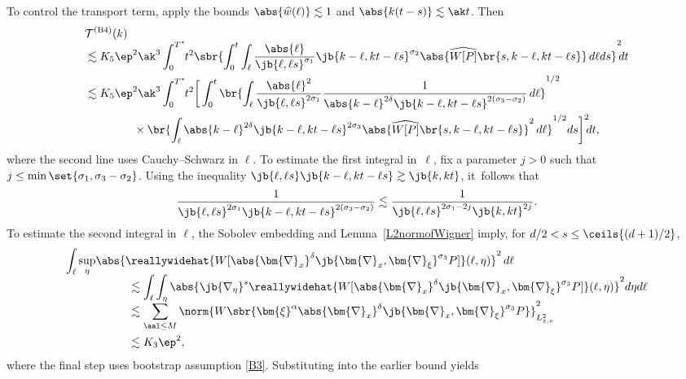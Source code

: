 To control the transport term, apply the bounds $\abs{\widehat w(\ell)}\lesssim1$ and $\abs{k(t-s)}\lesssim\ak t$. Then
\begin{align*}
&\mathcal{T}^{\mathrm{(B4)}}(k)\\[-5pt]
&\lesssim K_5\ep^2\ak^3\int_{0}^{T^*}\hspace{-0.1cm}t^2\sbr{\int_{0}^t\int_\ell\frac{\abs{\ell}}{\jb{\ell,\ell s}^{\sigma_1}} \jb{k-\ell,kt-\ell s}^{\sigma_2}\abs{\widehat {W[P]}\br{s,k-\ell,kt-\ell s}}\,d\ell ds}^2\hspace{-0.1cm}dt\\
&\lesssim K_5\ep^2\ak^3\int_{0}^{T^*}\hspace{-0.1cm}t^2\bigg[\int_{0}^t\br{\int_\ell\frac{\abs{\ell}^2}{\jb{\ell,\ell s}^{2\sigma_1}}\frac{1}{\abs{k-\ell}^{2\delta}\jb{k-\ell,kt-\ell s}^{2(\sigma_3-\sigma_2)}}\,d\ell}^{1/2} \\
&\hspace{1.5cm}\times\br{\int_\ell\abs{k-\ell}^{2\delta}\jb{k-\ell,kt-\ell s}^{2\sigma_3}\abs{\widehat {W[P]}\br{s,k-\ell,kt-\ell s}}^2\,d\ell}^{1/2} ds\bigg]^2\hspace{-0.1cm}dt,
\end{align*}
where the second line uses Cauchy–Schwarz in $\ell$. To estimate the first integral in~$\ell$, fix a parameter $j>0$ such that $j\leq \min\set{\sigma_1,\sigma_3-\sigma_2}$. Using the inequality \hbox{$\jb{\ell,\ell s}\jb{k-\ell,kt-\ell s}\gtrsim\jb{k,kt}$}, it~follows that\vspace*{-3pt}
\begin{align*}
\frac{1}{\jb{\ell,\ell s}^{2\sigma_1}\jb{k-\ell,kt-\ell s}^{2(\sigma_3-\sigma_2)}}\lesssim\frac{1}{\jb{\ell,\ell s}^{2\sigma_1-2j}\jb{k,kt}^{2j}}.
\end{align*} To estimate the second integral in $\ell$, the Sobolev embedding and Lemma~\ref{L2normofWigner} imply, for $d/2<s\leq \ceils{(d+1)/2}$,\vspace*{-3pt}
\begin{align*}
\int_\ell\sup_{\eta}&\abs{\reallywidehat{ W[\abs{\bm{\nabla}_x}^\delta\jb{\bm{\nabla}_x,\bm{\nabla}_\xi}^{\sigma_3}P]}(\ell,\eta)}^2\,d\ell\\[-5pt]
&\hspace{1cm}\lesssim\int_\ell\int_\eta\abs{\jb{\nabla_\eta}^{s}\reallywidehat{ W[\abs{\bm{\nabla}_x}^\delta\jb{\bm{\nabla}_x,\bm{\nabla}_\xi}^{\sigma_3}P]}(\ell,\eta)}^2d\eta d\ell\\[-5pt]
&\hspace{1cm}\lesssim\sum_{\aal\leq M}\norm{W\sbr{\bm{\xi}^\alpha\abs{\bm{\nabla}_x}^\delta\jb{\bm{\nabla}_x,\bm{\nabla}_\xi}^{\sigma_3}P}}_{L^2_{z,v}}^2\\
&\hspace{1cm}\lesssim K_3\ep^2,
\end{align*}where the final step uses bootstrap assumption \eqref{B3}. Substituting into the earlier bound yields
